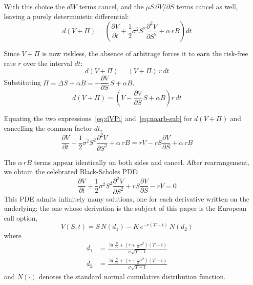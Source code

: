 \documentclass[a4paper,12pt]{article}
\numberwithin{equation}{section}
\begin{document}
With this choice the $dW$ terms cancel, and the $\mu S\,\partial V/\partial S$
terms cancel as well, leaving a purely deterministic differential:
\begin{equation}\label{eq:dVPi}
  d(V + \Pi) = \left(\frac{\partial V}{\partial t}
     + \frac{1}{2}\sigma^2 S^2\frac{\partial^2 V}{\partial S^2}
     + \alpha\,r B\right)dt 
\end{equation}

Since $V + \Pi$ is now riskless, the absence of arbitrage forces it to earn the
risk-free rate $r$ over the interval $dt$:
\begin{equation}\label{eq:noarb}
  d(V + \Pi) = (V + \Pi)\,r\,dt 
\end{equation}
Substituting $\Pi = \Delta S + \alpha B = -\dfrac{\partial V}{\partial S}\,S + \alpha B$,
\begin{equation}\label{eq:noarb-sub}
  d(V + \Pi) = \left(V - \frac{\partial V}{\partial S}\,S + \alpha B\right) r\,dt 
\end{equation}

Equating the two expressions~\eqref{eq:dVPi} and~\eqref{eq:noarb-sub} for
$d(V+\Pi)$ and cancelling the common factor $dt$,
\begin{equation}\label{eq:nodt}
  \frac{\partial V}{\partial t}
     + \frac{1}{2}\sigma^2 S^2\frac{\partial^2 V}{\partial S^2}
     + \alpha\,r B
  = rV - rS\frac{\partial V}{\partial S} + \alpha\,r B 
\end{equation}

The $\alpha\,r B$ terms appear identically on both sides and cancel.
After rearrangement, we obtain the celebrated Black-Scholes PDE:
\begin{equation}\label{eq:bs}
    \frac{\partial V}{\partial t}
    + \frac{1}{2}\sigma^2 S^2\frac{\partial^2 V}{\partial S^2}
    + rS\frac{\partial V}{\partial S} - rV = 0 
\end{equation}
This PDE admits infinitely many solutions, one for each derivative written on the
underlying; the one whose derivation is the subject of this paper is the European
call option,
\begin{equation}\label{eq:bs-call-preview}
    V(S,t) = S\,N(d_1) - K\,e^{-r(T-t)}\,N(d_2)
\end{equation}
where
\begin{align}
    d_1 &= \frac{\ln\frac{S}{K} + \left(r + \frac{1}{2}\sigma^2\right)(T-t)}{\sigma\sqrt{T-t}} \\
    d_2 &= \frac{\ln\frac{S}{K} + \left(r - \frac{1}{2}\sigma^2\right)(T-t)}{\sigma\sqrt{T-t}}
\end{align}
and $N(\cdot)$ denotes the standard normal cumulative distribution function.
\end{document}
